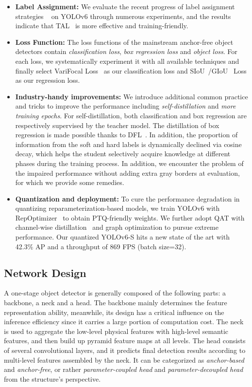 \documentclass[10pt,twocolumn,letterpaper]{article}
\begin{document}
\begin{itemize}
  \item \textbf{Label Assignment:} We evaluate the recent progress of label assignment strategies ~\cite{zhang2020atss,ge2021yolox,feng2021tood,dw_CVPR,Zand2022ObjectBoxFC} on YOLOv6 through numerous experiments, and the results indicate that TAL~\cite{feng2021tood} is more effective and training-friendly.
  \item \textbf{Loss Function:} The loss functions of the mainstream anchor-free object detectors contain \emph{classification loss}, \emph{box regression loss} and \emph{object loss}. For each loss, we systematically experiment it with all available techniques and finally select VariFocal Loss~\cite{zhang2021varifocalnet} as our classification loss and SIoU~\cite{gevorgyan2022siou}/GIoU~\cite{rezatofighi2019generalized} Loss as our regression loss. 
\item \textbf{Industry-handy improvements:} We introduce additional common practice and tricks to improve the performance including \emph{self-distillation} and \emph{more training epochs}. For self-distillation, both classification and box regression are respectively supervised by the teacher model. The distillation of box regression is made possible thanks to DFL~\cite{li2020generalized}. In addition, the proportion of information from the soft and hard labels is dynamically declined via cosine decay, which helps the student selectively acquire knowledge at different phases during the training process. In addition, we encounter the problem of the impaired performance without adding extra gray borders at evaluation, for which we provide some remedies.
  \item \textbf{Quantization and deployment:} To cure the performance degradation in quantizing reparameterization-based models, we train YOLOv6 with RepOptimizer~\cite{ding2022re} to obtain PTQ-friendly weights. We further adopt QAT with channel-wise distillation~\cite{shu2021channel} and graph optimization to pursue extreme performance. Our quantized YOLOv6-S hits a new state of the art with 42.3\% AP and a throughput of 869 FPS (batch size=32).
  \end{itemize}

\subsection{Network Design}
  \label{sec:method:network}
  A one-stage object detector is generally composed of the following parts: a backbone, a neck and a head. The backbone mainly determines the feature representation ability, meanwhile, its design has a critical influence on the inference efficiency since it carries a large portion of computation cost. The neck is used to aggregate the low-level physical features with high-level semantic features, and then build up pyramid feature maps at all levels. The head consists of several convolutional layers, and it predicts final detection results according to multi-level features assembled by the neck. It can be categorized as \emph{anchor-based} and \emph{anchor-free}, or rather \emph{parameter-coupled head} and \emph{parameter-decoupled head} from the structure's perspective.
\end{document}
